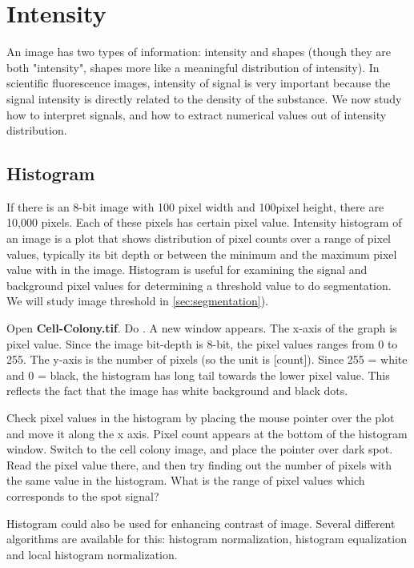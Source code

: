 
\section{Intensity}

An image has two types of information: intensity and shapes (though they
are both "intensity", shapes more
like a meaningful distribution of intensity). In scientific
fluorescence images, intensity of signal is very important because the
signal intensity is directly related to the density of the substance.
We now study how to interpret signals, and how to extract numerical
values out of intensity distribution. 

\subsection{Histogram}
\label{subsec:histogram}

If there is an 8-bit image with 100 pixel width and 100pixel height,
there are 10,000 pixels. Each of these pixels has certain pixel value.
Intensity histogram of an image is a plot that shows distribution of pixel counts over a range of pixel values, 
typically its bit depth or between the minimum and the maximum pixel value with in the image. 
Histogram is useful for examining the signal and
background pixel values for determining a threshold value to do segmentation.
We will study image threshold in \ref{sec:segmentation}). 


\begin{indentexercise}{1}
Open \textbf{Cell-Colony.tif}. Do
. A new window appears. The
x-axis of the graph is pixel value. Since the image bit-depth is 8-bit,
the pixel values ranges from 0 to 255. The y-axis is the number of
pixels (so the unit is [count]). Since 255 = white and 0 = black, the
histogram has long tail towards the lower pixel value. This reflects
the fact that the image has white background and black dots.

Check pixel values in the histogram by placing the mouse pointer over
the plot and move it along the x axis. Pixel count appears at the
bottom of the histogram window. Switch to the cell colony image, and
place the pointer over dark spot. Read the pixel value there, and then
try finding out the number of pixels with the same value in the
histogram. What is the range of pixel values which corresponds to the
spot signal?  
\end{indentexercise} 
Histogram could also be used for enhancing contrast of image. Several
different algorithms are available for this: histogram normalization,
histogram equalization and local histogram normalization. 


